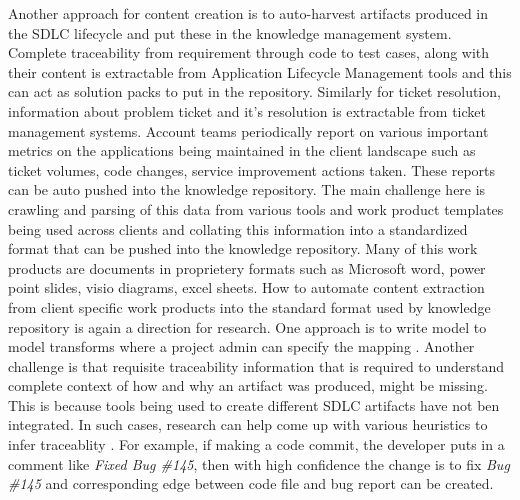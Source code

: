 Another approach for content creation is to auto-harvest artifacts produced in the SDLC lifecycle and put these in the knowledge management system. Complete traceability from requirement through code to test cases, along with their content is extractable from Application Lifecycle Management tools and this can act as solution packs to put in the repository. Similarly for ticket resolution, information about problem ticket and it's resolution is extractable from ticket management systems. Account teams periodically report on various important metrics on the applications being maintained in the client landscape such as ticket volumes, code changes, service improvement actions taken. These reports can be auto pushed into the knowledge repository. The main challenge here is crawling and parsing of this data from various tools and work product templates being used across clients and collating this information into a standardized format that can be pushed into the knowledge repository. Many of this work products are documents in proprietery formats such as Microsoft word, power point slides, visio diagrams, excel sheets. How to automate content extraction from client specific work products into the standard format used by knowledge repository is again a direction for research. One approach is to write model to model transforms where a project admin can specify the mapping \cite{}. Another challenge is that requisite traceability information that is required to understand complete context of how and why an artifact was produced, might be missing. This is because tools being used to create different SDLC artifacts have not ben integrated. In such cases, research can help come up with various heuristics to infer traceablity \cite{}. For example, if making a code commit, the developer puts in a comment like \textit{Fixed Bug \#145}, then with high confidence the change is to fix \textit{Bug \#145} and corresponding edge between code file and bug report can be created.


